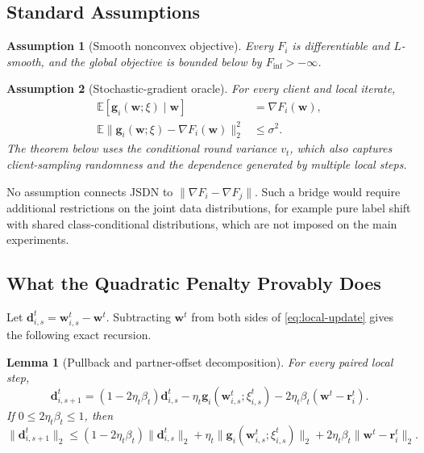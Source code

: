 \documentclass[journal,twoside,web]{ieeecolor}
\newtheorem{assumption}{Assumption}
\newtheorem{lemma}{Lemma}
\begin{document}
\subsection{Standard Assumptions}

\begin{assumption}[Smooth nonconvex objective]
Every $F_i$ is differentiable and $L$-smooth, and the global objective is
bounded below by $F_{\inf}>-\infty$.
\end{assumption}

\begin{assumption}[Stochastic-gradient oracle]
For every client and local iterate,
\begin{align}
 \mathbb E[\bm g_i(\bm w;\xi)\mid\bm w]&=\nabla F_i(\bm w),\\
 \mathbb E\|\bm g_i(\bm w;\xi)-\nabla F_i(\bm w)\|_2^2&\leq\sigma^2.
\end{align}
The theorem below uses the conditional round variance $v_t$, which also
captures client-sampling randomness and the dependence generated by multiple
local steps.
\end{assumption}

No assumption connects JSDN to $\|\nabla F_i-\nabla F_j\|$. Such a bridge
would require additional restrictions on the joint data distributions, for
example pure label shift with shared class-conditional distributions, which
are not imposed on the main experiments.

\subsection{What the Quadratic Penalty Provably Does}

Let $\bm d_{i,s}^{t}=\bm w_{i,s}^{t}-\bm w^t$. Subtracting $\bm w^t$ from
both sides of \eqref{eq:local-update} gives the following exact recursion.

\begin{lemma}[Pullback and partner-offset decomposition]                 \label{lem:pullback}
For every paired local step,
\begin{equation}
 \bm d_{i,s+1}^{t}
 =(1-2\eta_t\beta_t)\bm d_{i,s}^{t}
 -\eta_t\bm g_i(\bm w_{i,s}^{t};\xi_{i,s}^{t})
 -2\eta_t\beta_t(\bm w^t-\bm r_i^t).                  \label{eq:pullback-recursion}
\end{equation}
If $0\leq2\eta_t\beta_t\leq1$, then
\begin{equation}
 \|\bm d_{i,s+1}^{t}\|_2
 \leq(1-2\eta_t\beta_t)\|\bm d_{i,s}^{t}\|_2
 +\eta_t\|\bm g_i(\bm w_{i,s}^{t};\xi_{i,s}^{t})\|_2
 +2\eta_t\beta_t\|\bm w^t-\bm r_i^t\|_2.             \label{eq:pullback-bound}
\end{equation}
\end{lemma}
\end{document}
